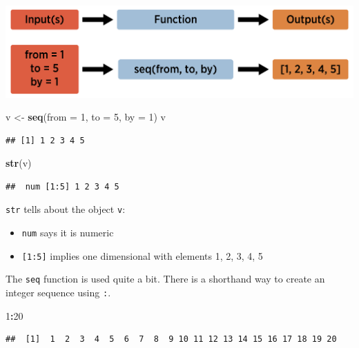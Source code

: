\documentclass[
]{book}
\newenvironment{Shaded}{\begin{snugshade}}{\end{snugshade}}
\newcommand{\DataTypeTok}[1]{\textcolor[rgb]{0.13,0.29,0.53}{#1}}
\newcommand{\DecValTok}[1]{\textcolor[rgb]{0.00,0.00,0.81}{#1}}
\newcommand{\KeywordTok}[1]{\textcolor[rgb]{0.13,0.29,0.53}{\textbf{#1}}}
\newcommand{\NormalTok}[1]{#1}
\newcommand{\OperatorTok}[1]{\textcolor[rgb]{0.81,0.36,0.00}{\textbf{#1}}}
\newcommand{\StringTok}[1]{\textcolor[rgb]{0.31,0.60,0.02}{#1}}
\theoremstyle{definition}
\theoremstyle{definition}
\theoremstyle{definition}
\theoremstyle{remark}
\begin{document}
\begin{center}\includegraphics[width=0.8\linewidth]{img/funVisual2F} \end{center}

\begin{Shaded}
\begin{Highlighting}[]
\NormalTok{v <-}\StringTok{ }\KeywordTok{seq}\NormalTok{(}\DataTypeTok{from =} \DecValTok{1}\NormalTok{, }\DataTypeTok{to =} \DecValTok{5}\NormalTok{, }\DataTypeTok{by =} \DecValTok{1}\NormalTok{)}
\NormalTok{v}
\end{Highlighting}
\end{Shaded}

\begin{verbatim}
## [1] 1 2 3 4 5
\end{verbatim}

\begin{Shaded}
\begin{Highlighting}[]
\KeywordTok{str}\NormalTok{(v)}
\end{Highlighting}
\end{Shaded}

\begin{verbatim}
##  num [1:5] 1 2 3 4 5
\end{verbatim}

\texttt{str} tells about the object \texttt{v}:

\begin{itemize}
\item
  \texttt{num} says it is numeric
\item
  \texttt{{[}1:5{]}} implies one dimensional with elements 1, 2, 3, 4, 5
\end{itemize}

The \texttt{seq} function is used quite a bit. There is a shorthand way to create an integer sequence using \texttt{:}.

\begin{Shaded}
\begin{Highlighting}[]
\DecValTok{1}\OperatorTok{:}\DecValTok{20} 
\end{Highlighting}
\end{Shaded}

\begin{verbatim}
##  [1]  1  2  3  4  5  6  7  8  9 10 11 12 13 14 15 16 17 18 19 20
\end{verbatim}
\end{document}
